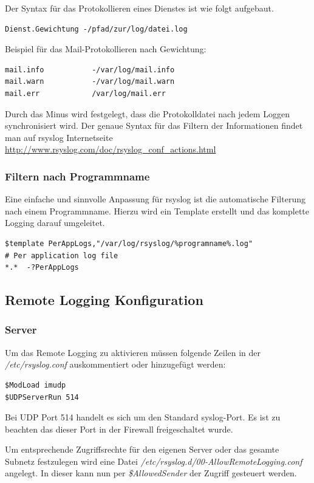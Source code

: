 Der Syntax für das Protokollieren eines Dienstes ist wie folgt aufgebaut.
\begin{lstlisting}
Dienst.Gewichtung -/pfad/zur/log/datei.log
\end{lstlisting}

Beispiel für das Mail-Protokollieren nach Gewichtung:
\begin{lstlisting}
mail.info           -/var/log/mail.info
mail.warn           -/var/log/mail.warn
mail.err            /var/log/mail.err
\end{lstlisting}

Durch das Minus wird festgelegt, dass die Protokolldatei nach jedem Loggen synchronisiert wird. Der genaue Syntax für das Filtern der Informationen findet man auf rsyslog Internetseite \url{http://www.rsyslog.com/doc/rsyslog_conf_actions.html}

\subsubsection{Filtern nach Programmname}
Eine einfache und sinnvolle Anpassung für rsyslog ist die automatische Filterung nach einem Programmname. Hierzu wird ein Template erstellt und das komplette Logging darauf umgeleitet.

\begin{lstlisting}
$template PerAppLogs,"/var/log/rsyslog/%programname%.log"
# Per application log file
*.*  -?PerAppLogs
\end{lstlisting}

\subsection{Remote Logging Konfiguration}

\subsubsection{Server}
Um das Remote Logging zu aktivieren müssen folgende Zeilen in der \textit{/etc/rsyslog.conf} auskommentiert oder hinzugefügt werden:

\begin{lstlisting}
$ModLoad imudp
$UDPServerRun 514
\end{lstlisting}

Bei UDP Port 514 handelt es sich um den Standard syslog-Port. Es ist zu beachten das dieser Port in der Firewall freigeschaltet wurde.

Um entsprechende Zugriffsrechte für den eigenen Server oder das gesamte Subnetz festzulegen wird eine Datei \textit{/etc/rsyslog.d/00-AllowRemoteLogging.conf} angelegt. In dieser kann nun per \textit{\$AllowedSender} der Zugriff gesteuert werden.

